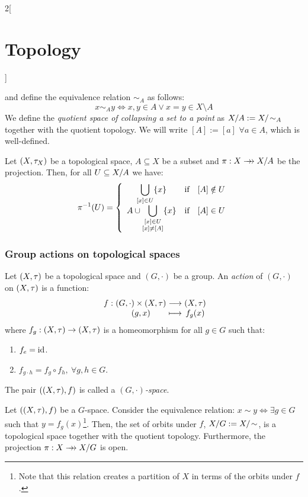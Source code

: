 \documentclass[../../../main.tex]{subfiles}
\begin{document}
\begin{multicols}{2}[\section{Topology}]
\begin{definition}
    and define the equivalence relation $\sim_A$ as follows: $$x\sim_A y\iff x,y\in A\lor x=y\in X\setminus A$$
    We define the \emph{quotient space of collapsing a set to a point} as $\quot{X}{A}:=\quot{X}{\!\sim_A}$ together with the quotient topology. We will write $[A]:=[a]$ $\forall a\in A$, which is well-defined.
  \end{definition}
  \begin{prop}
    Let $(X,\tau_X)$ be a topological space, $A\subseteq X$ be a subset and $\pi:X\rrightarrow\quot{X}{A}$ be the projection. Then, for all $U\subseteq\quot{X}{A}$ we have:
    $$
      \pi^{-1}(U)=\left\{\begin{array}{ccc}
        \displaystyle\bigcup_{[x]\in U}\{x\} & \text{if} & [A]\notin U \\
        \displaystyle A\cup \bigcup_{
          \begin{subarray}{c}
            [x]\in U \\
            [x]\ne [A]
          \end{subarray}
        }\{x\}                               & \text{if} & [A]\in U
      \end{array}\right.
    $$
  \end{prop}
  \subsubsection{Group actions on topological spaces}
  \begin{definition}
    Let $(X,\tau)$ be a topological space and $(G,\cdot)$ be a group. An \emph{action} of $(G,\cdot)$ on $(X,\tau)$ is a function:
    $$\function{f}{(G,\cdot)\times(X,\topo)}{(X,\topo)}{(g,x)}{f_g(x)}$$ where $f_g:(X,\tau)\rightarrow(X,\tau)$ is a homeomorphism for all $g\in G$ such that:
    \begin{enumerate}
      \item $f_e=\mathrm{id}$.
      \item $f_{g\cdot h}=f_g\circ f_h,\ \forall g,h\in G$.
    \end{enumerate}
    The pair $((X,\tau),f)$ is called a \emph{$(G,\cdot)$-space}.
  \end{definition}
  \begin{prop}
    Let $((X,\tau),f)$ be a $G$-space. Consider the equivalence relation: $x\sim y\iff\exists g\in G$ such that $y=f_g(x)$\footnote{Note that this relation creates a partition of $X$ in terms of the orbits under $f$.}. Then, the set of orbits under $f$, $\quot{X}{G}:=\quot{X}{\!\sim}$, is a topological space together with the quotient topology. Furthermore, the projection $\pi:X\rrightarrow\quot{X}{G}$ is open.
  \end{prop}

\end{multicols}
\end{document}
